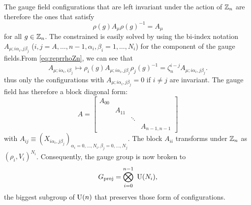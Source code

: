 \documentclass[a4paper,11pt]{article}
\begin{document}
        The gauge field configurations that are left invariant under the action of $\mathbb{Z}_n$ are therefore the ones that satisfy
        \begin{equation}
            \rho(g)A_\mu\rho(g)^{-1}=A_\mu
        \end{equation}
        for all $g\in\mathbb{Z}_n$. The constrained is easily solved by using the bi-index notation $A_{\mu;i\alpha_i,j\beta_j}$ ($i,j=A,\dots,n-1,\alpha_i,\beta_i=1,\dots,N_i$) for the component of the gauge fields.From \eqref{eq:reprrhoZn}, we can see that
        \begin{equation}
            A_{\mu;i\alpha_i,i\beta_j}\mapsto \rho_i(g)A_{\mu;i\alpha_i,j\beta_j}\rho_j(g)^{-1}=\zeta^{i-j}_nA_{\mu;i\alpha_i,j\beta_j}.
        \end{equation}
        thus only the configurations with $A_{\mu;i\alpha_i,j\beta_j}=0$ if $i\neq j$ are invariant. The gauge field has therefore a block diagonal form:
        \begin{equation}
            A=
            \begin{bmatrix}
                A_{00} & & & \\
                 & A_{11} & & \\
                 & & \ddots & \\
                 & & & A_{n-1,n-1}
            \end{bmatrix}
        \end{equation}
        with $A_{ij}\equiv (X_{i\alpha_i,j\beta_j})_{\alpha_i=0,\dots,N_i,\beta_j=0,\dots,N_j}$. The block $A_{ii}$ transforms under $\mathbb{Z}_n$ as $(\rho_i,V_i)^{N_i}$.
        Consequently, the gauge group is now broken to
        \begin{equation}
            G_{\text{proj}}=\bigotimes^{n-1}_{i=0}~\text{U}(N_i),
        \end{equation}
        the biggest subgroup of $\text{U}(n)$ that preserves those form of configurations.
\end{document}
